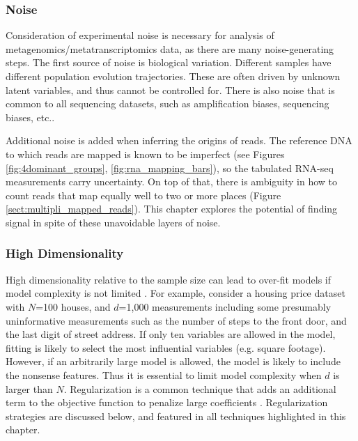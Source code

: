 \subsubsection{Noise}
Consideration of experimental noise is necessary for analysis of metagenomics/metatranscriptomics data, as there are many noise-generating steps.
The first source of noise is biological variation.
Different samples have different population evolution trajectories.
These are often driven by unknown latent variables, and thus cannot be controlled for.
There is also noise that is common to all sequencing datasets, such as amplification biases, sequencing biases, etc..

Additional noise is added when inferring the origins of reads.
The reference DNA to which reads are mapped is known to be imperfect (see Figures \ref{fig:4dominant_groups}, \ref{fig:rna_mapping_bars}), so the tabulated RNA-seq measurements carry uncertainty.
On top of that, there is ambiguity in how to count reads that map equally well to two or more places (Figure \ref{sect:multipli_mapped_reads}).
This chapter explores the potential of finding signal in spite of these unavoidable layers of noise.

\subsubsection{High Dimensionality}
High dimensionality relative to the sample size can lead to over-fit models if model complexity is not limited \cite{friedman2001}. %
For example, consider a housing price dataset with $N$=100 houses, and $d$=1,000 measurements including some presumably uninformative measurements such as the number of steps to the front door, and the last digit of street address.
If only ten variables are allowed in the model, fitting is likely to select the most influential variables (e.g. square footage).
However, if an arbitrarily large model is allowed, the model is likely to include the nonsense features.
Thus it is essential to limit model complexity when $d$ is larger than $N$.
Regularization is a common technique that adds an additional term to the objective function to penalize large coefficients \cite{friedman2001}.
Regularization strategies are discussed below, and featured in all techniques highlighted in this chapter.

